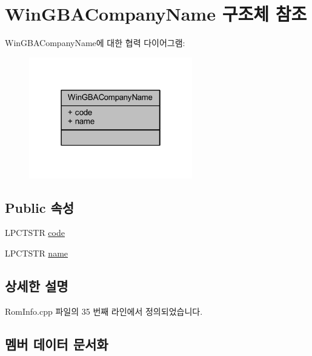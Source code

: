 \hypertarget{struct_win_g_b_a_company_name}{}\section{Win\+G\+B\+A\+Company\+Name 구조체 참조}
\label{struct_win_g_b_a_company_name}


Win\+G\+B\+A\+Company\+Name에 대한 협력 다이어그램\+:\nopagebreak
\begin{figure}[H]
\begin{center}
\leavevmode
\includegraphics[width=202pt]{struct_win_g_b_a_company_name__coll__graph}
\end{center}
\end{figure}
\subsection*{Public 속성}
\begin{DoxyCompactItemize}
\item 
L\+P\+C\+T\+S\+TR \mbox{\hyperlink{struct_win_g_b_a_company_name_a8c8a9f3a68535b96bae0b3c1734a1696}{code}}
\item 
L\+P\+C\+T\+S\+TR \mbox{\hyperlink{struct_win_g_b_a_company_name_a61746fed679453b425013ae539c4c3a7}{name}}
\end{DoxyCompactItemize}


\subsection{상세한 설명}


Rom\+Info.\+cpp 파일의 35 번째 라인에서 정의되었습니다.



\subsection{멤버 데이터 문서화}
\mbox{\label{struct_win_g_b_a_company_name_a8c8a9f3a68535b96bae0b3c1734a1696}} 
